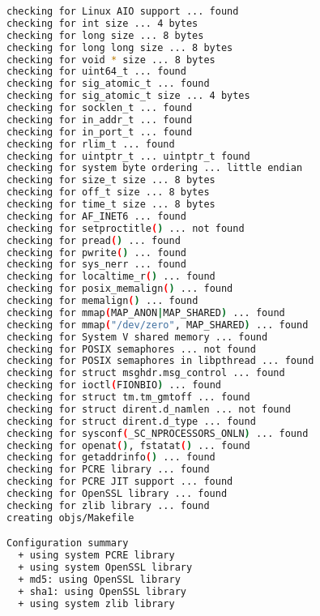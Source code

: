 \begin{lstlisting}[language=bash]
checking for Linux AIO support ... found
checking for int size ... 4 bytes
checking for long size ... 8 bytes
checking for long long size ... 8 bytes
checking for void * size ... 8 bytes
checking for uint64_t ... found
checking for sig_atomic_t ... found
checking for sig_atomic_t size ... 4 bytes
checking for socklen_t ... found
checking for in_addr_t ... found
checking for in_port_t ... found
checking for rlim_t ... found
checking for uintptr_t ... uintptr_t found
checking for system byte ordering ... little endian
checking for size_t size ... 8 bytes
checking for off_t size ... 8 bytes
checking for time_t size ... 8 bytes
checking for AF_INET6 ... found
checking for setproctitle() ... not found
checking for pread() ... found
checking for pwrite() ... found
checking for sys_nerr ... found
checking for localtime_r() ... found
checking for posix_memalign() ... found
checking for memalign() ... found
checking for mmap(MAP_ANON|MAP_SHARED) ... found
checking for mmap("/dev/zero", MAP_SHARED) ... found
checking for System V shared memory ... found
checking for POSIX semaphores ... not found
checking for POSIX semaphores in libpthread ... found
checking for struct msghdr.msg_control ... found
checking for ioctl(FIONBIO) ... found
checking for struct tm.tm_gmtoff ... found
checking for struct dirent.d_namlen ... not found
checking for struct dirent.d_type ... found
checking for sysconf(_SC_NPROCESSORS_ONLN) ... found
checking for openat(), fstatat() ... found
checking for getaddrinfo() ... found
checking for PCRE library ... found
checking for PCRE JIT support ... found
checking for OpenSSL library ... found
checking for zlib library ... found
creating objs/Makefile

Configuration summary
  + using system PCRE library
  + using system OpenSSL library
  + md5: using OpenSSL library
  + sha1: using OpenSSL library
  + using system zlib library


\end{lstlisting}
